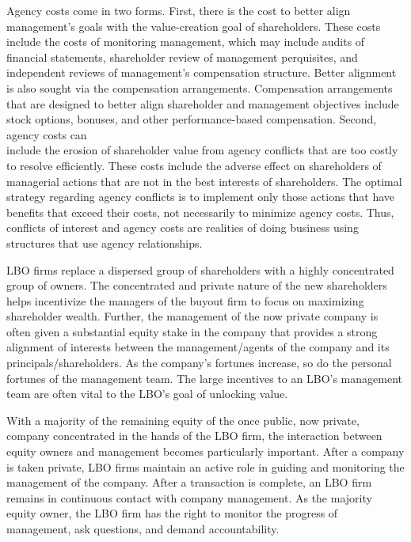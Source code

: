 \documentclass[11pt]{article}
\begin{document}
Agency costs come in two forms. First, there is the cost to better align management's goals with the value-creation goal of shareholders. These costs include the costs of monitoring management, which may include audits of financial statements, shareholder review of management perquisites, and independent reviews of management's compensation structure. Better alignment is also sought via the compensation arrangements. Compensation arrangements that are designed to better align shareholder and management objectives include stock options, bonuses, and other performance-based compensation. Second, agency costs can\\
include the erosion of shareholder value from agency conflicts that are too costly to resolve efficiently. These costs include the adverse effect on shareholders of managerial actions that are not in the best interests of shareholders. The optimal strategy regarding agency conflicts is to implement only those actions that have benefits that exceed their costs, not necessarily to minimize agency costs. Thus, conflicts of interest and agency costs are realities of doing business using structures that use agency relationships.

LBO firms replace a dispersed group of shareholders with a highly concentrated group of owners. The concentrated and private nature of the new shareholders helps incentivize the managers of the buyout firm to focus on maximizing shareholder wealth. Further, the management of the now private company is often given a substantial equity stake in the company that provides a strong alignment of interests between the management/agents of the company and its principals/shareholders. As the company's fortunes increase, so do the personal fortunes of the management team. The large incentives to an LBO's management team are often vital to the LBO's goal of unlocking value.

With a majority of the remaining equity of the once public, now private, company concentrated in the hands of the LBO firm, the interaction between equity owners and management becomes particularly important. After a company is taken private, LBO firms maintain an active role in guiding and monitoring the management of the company. After a transaction is complete, an LBO firm remains in continuous contact with company management. As the majority equity owner, the LBO firm has the right to monitor the progress of management, ask questions, and demand accountability.
\end{document}
